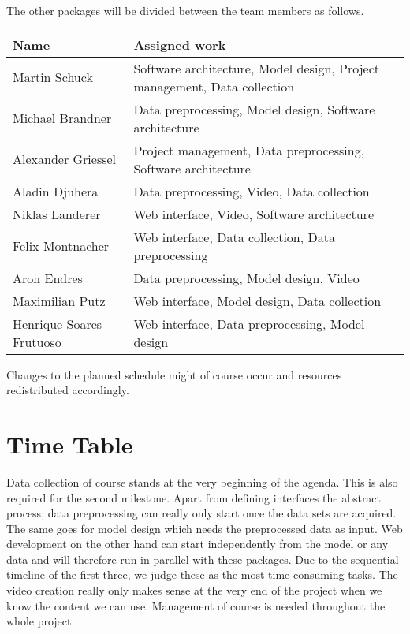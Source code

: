 \documentclass[s=english,inputenc=utf8,fontsize=10pt]{ldvarticle}
\begin{document}
The other packages will be divided between the team members as follows. 
\begin{center}
	\begin{footnotesize}
		\setlength{\arrayrulewidth}{1,05pt}
		\begin{tabular}[htb]{|p{3cm}|p{9.1cm}|}
			\hline
			\textbf{Name} & \textbf{Assigned work} \\
			\hline
			\hline
			\rowcolor{lightgray} Martin Schuck & Software architecture, Model design, Project management, Data collection \\
			\hline
			\rowcolor{lightgray} Michael Brandner & Data preprocessing, Model design, Software architecture \\
			\hline	
			\rowcolor{lightgray} Alexander Griessel & Project management, Data preprocessing, Software architecture \\
			\hline
			\rowcolor{lightgray} Aladin Djuhera & Data preprocessing, Video, Data collection \\
			\hline
			\rowcolor{lightgray} Niklas Landerer & Web interface, Video, Software architecture \\
			\hline
			\rowcolor{lightgray} Felix Montnacher & Web interface, Data collection, Data preprocessing\\
			\hline	
			\rowcolor{lightgray} Aron Endres & Data preprocessing, Model design, Video \\
			\hline
			\rowcolor{lightgray} Maximilian Putz & Web interface, Model design, Data collection \\
			\hline
			\rowcolor{lightgray} Henrique Soares Frutuoso & Web interface, Data preprocessing, Model design \\
			\hline
		\end{tabular}
	\end{footnotesize}
\end{center}
Changes to the planned schedule might of course occur and resources redistributed accordingly.
\newpage

\section{Time Table}

Data collection of course stands at the very beginning of the agenda. This is also required for the second milestone. Apart from defining interfaces the abstract process, data preprocessing can really only start once the data sets are acquired. The same goes for model design which needs the preprocessed data as input. Web development on the other hand can start independently from the model or any data and will therefore run in parallel with these packages. Due to the sequential timeline of the first three, we judge these as the most time consuming tasks. The video creation really only makes sense at the very end of the project when we know the content we can use. Management of course is needed throughout the whole project.
\end{document}
